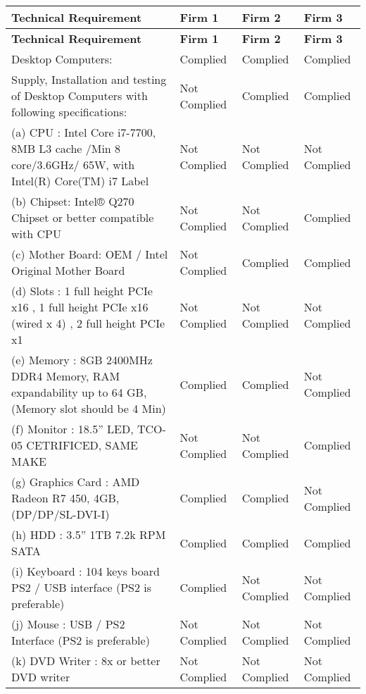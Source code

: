 \documentclass[12pt]{article}
\begin{document}
\begin{longtable}{|>{\raggedright\arraybackslash}p{7cm}|
                        >{\centering\arraybackslash}p{2.5cm}|
                        >{\centering\arraybackslash}p{2.5cm}|
                        >{\centering\arraybackslash}p{2.5cm}|}
\hline
\rowcolor{blue!20}
\textbf{Technical Requirement} & \textbf{Firm 1} & \textbf{Firm 2} & \textbf{Firm 3} \\
\hline
\endfirsthead

\hline
\rowcolor{blue!20}
\textbf{Technical Requirement} & \textbf{Firm 1} & \textbf{Firm 2} & \textbf{Firm 3} \\
\hline
\endhead

Desktop Computers: & Complied & Complied & Complied \\
01 Supply, Installation and testing of Desktop Computers with following specifications: & Not Complied & Complied & Complied \\
(a) CPU : Intel Core i7-7700, 8MB L3 cache /Min 8 core/3.6GHz/ 65W, with Intel(R) Core(TM) i7 Label & Not Complied & Not Complied & Not Complied \\
(b) Chipset: Intel® Q270 Chipset or better compatible with CPU & Not Complied & Not Complied & Complied \\
(c) Mother Board: OEM / Intel Original Mother Board & Not Complied & Complied & Complied \\
(d) Slots : 1 full height PCIe x16 , 1 full height PCIe x16 (wired x 4) , 2 full height PCIe x1 & Not Complied & Not Complied & Not Complied \\
(e) Memory : 8GB 2400MHz DDR4 Memory, RAM expandability up to 64 GB, (Memory slot should be 4 Min) & Complied & Complied & Not Complied \\
(f) Monitor : 18.5” LED, TCO-05 CETRIFICED, SAME MAKE & Not Complied & Not Complied & Complied \\
(g) Graphics Card : AMD Radeon R7 450, 4GB, (DP/DP/SL-DVI-I) & Complied & Complied & Not Complied \\
(h) HDD : 3.5” 1TB 7.2k RPM SATA & Complied & Complied & Complied \\
(i) Keyboard : 104 keys board PS2 / USB interface (PS2 is preferable) & Complied & Not Complied & Not Complied \\
(j) Mouse : USB / PS2 Interface (PS2 is preferable) & Not Complied & Not Complied & Not Complied \\
(k) DVD Writer : 8x or better DVD writer & Not Complied & Not Complied & Not Complied \\

\end{longtable}
\end{document}
